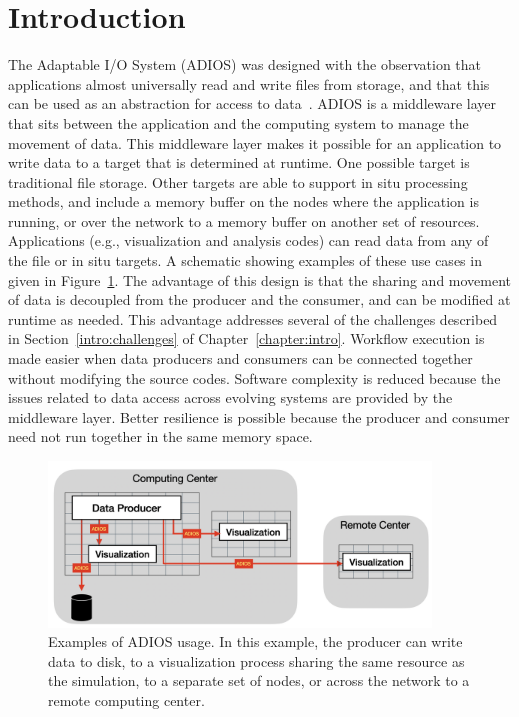 \section{Introduction}


The Adaptable I/O System (ADIOS) was designed with the observation that applications almost universally read and write files from storage, and that this can be used as an abstraction for access to data~\cite{godoy2020}. ADIOS is a middleware layer that sits between the application and the computing system to manage the movement of data. This middleware layer makes it possible for an application to write data to a target that is determined at runtime. One possible target is traditional file storage. 
Other targets are able to support in situ processing methods, and include a memory buffer on the nodes where the application is running, or over the network to a memory buffer on another set of resources. Applications (e.g., visualization and analysis codes) can read data from any of the file or in situ targets. A schematic showing examples of these use cases in given in Figure~\ref{ch10:fig:adios_design}.  The advantage of this design is that the sharing and movement of data is decoupled from the producer and the consumer, and can be modified at runtime as needed. This advantage addresses several of the challenges described in Section~\ref{intro:challenges} of Chapter~\ref{chapter:intro}. Workflow execution is made easier when data producers and consumers can be connected together without modifying the source codes. Software complexity is reduced because the issues related to data access across evolving systems are provided by the middleware layer. Better resilience is possible because the producer and consumer need not run together in the same memory space.

\begin{figure}[htb]
    \centering
    \includegraphics[width=4in]{figures/ADIOS}
    \caption{Examples of ADIOS usage. In this example, the producer can write data to disk, to a visualization process sharing the same resource as the simulation, to a separate set of nodes, or across the network to a remote computing center.}
    \label{ch10:fig:adios_design}
\end{figure}


